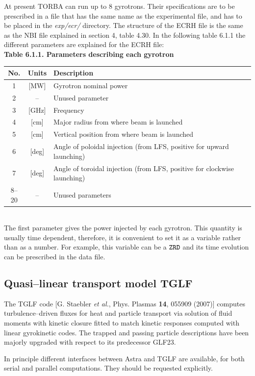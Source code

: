At present TORBA can run up to 8 gyrotrons. Their specifications are to be 
prescribed in a file that has the same name as the experimental file, and has to
be placed in the {\it exp/ecr/} directory. The structure of the ECRH file is the
same as the NBI file explained in section 4, table 4.30. In the following table 
6.1.1 the different parameters are explained for the ECRH file:\\
\noindent
{\bf Table 6.1.1. Parameters describing each gyrotron}\\[2ex]
\begin{tabular}{| c | c | l |}
\hline
\bf No.&\bf\hspace*{-1pt}Units\hspace*{-1pt}&\bf Description\\
\hline
1  &[MW]& Gyrotron nominal power					\\
2  &--& Unused parameter \\
3  &[GHz]& Frequency\\
4  &[cm]& Major radius from where beam is launched	\\
5  &[cm]& Vertical position from where beam is launched	\\
6  &[deg]& Angle of poloidal injection (from LFS, positive for upward launching) 	\\
7  &[deg]& Angle of toroidal injection (from LFS, positive for clockwise launching)	\\
8--20 &--& Unused parameters	\\
\hline
\end{tabular}\\[15pt]
The first parameter gives the power injected by each gyrotron.
This quantity is usually time dependent, therefore, it is convenient to
set it as a variable rather than as a number. 
For example, this variable can be a $\tt ZRD$
and its time evolution can be prescribed in the data file.
%
\subsection{Quasi--linear transport model TGLF}
The TGLF code [G. Staebler {\it et al.}, Phys. Plasmas {\bf 14}, 055909 (2007)] 
computes turbulence--driven fluxes for heat and particle transport via solution
of fluid moments with kinetic closure fitted to match kinetic responses computed
with linear gyrokinetic codes. The trapped and passing particle descriptions 
have been majorly upgraded with respect to its predecessor GLF23.

In principle different interfaces between Astra and TGLF are available, for both
serial and parallel computations. They should be requested explicitly.
%

